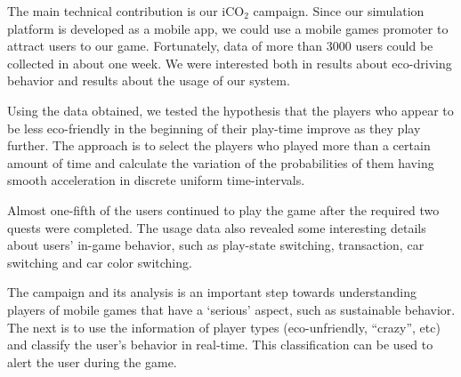 \documentclass[preprint,authoryear,12pt]{elsarticle}
\newcommand{\hlc}[2][yellow]{ {\sethlcolor{#1} \hl{#2}} }
\begin{document}
The main technical contribution is our iCO$_2$ campaign. Since our simulation platform is developed as a mobile app, we could use a mobile games promoter to attract users to our game. Fortunately, data of more than 3000 users could be collected in about one week. We were interested both in results about eco-driving behavior and results about the usage of our system.

Using the data obtained, we tested the hypothesis that the players who appear to be less eco-friendly in the beginning of their play-time improve as they play further. The approach is to select the players who played more than a certain amount of time and calculate the variation of the probabilities of them having smooth acceleration in discrete uniform time-intervals.


Almost one-fifth of the users continued to play the game after the required two quests were completed. The usage data also revealed some interesting details about users' in-game behavior, such as play-state switching, transaction, car switching and car color switching.




The campaign and its analysis is an important step towards understanding players of mobile games that have a `serious' aspect, such as sustainable behavior. The next is to use the information of player types (eco-unfriendly, ``crazy'', etc) and classify the user's behavior in real-time. This classification can be used to alert the user during the game.
\end{document}
